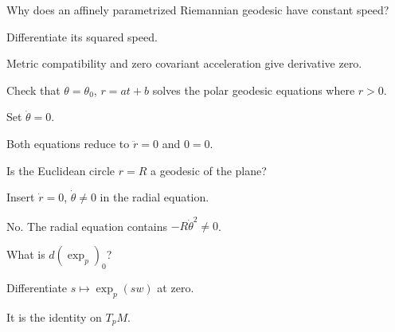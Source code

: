 \begin{exercise}\label{exr:vii23-ped-02}
Why does an affinely parametrized Riemannian geodesic have constant speed?
\end{exercise}

\begin{hint}
Differentiate its squared speed.
\end{hint}

\begin{solution}
Metric compatibility and zero covariant acceleration give derivative zero.
\end{solution}

\begin{exercise}\label{exr:vii23-ped-03}
Check that \(\theta=\theta_0\), \(r=at+b\) solves the polar geodesic equations where \(r>0\).
\end{exercise}

\begin{hint}
Set \(\dot\theta=0\).
\end{hint}

\begin{solution}
Both equations reduce to \(\ddot r=0\) and \(0=0\).
\end{solution}

\begin{exercise}\label{exr:vii23-ped-04}
Is the Euclidean circle \(r=R\) a geodesic of the plane?
\end{exercise}

\begin{hint}
Insert \(\dot r=0\), \(\dot\theta\ne0\) in the radial equation.
\end{hint}

\begin{solution}
No.  The radial equation contains \(-R\dot\theta^2\ne0\).
\end{solution}

\begin{exercise}\label{exr:vii23-ped-05}
What is \(d(\exp_p)_0\)?
\end{exercise}

\begin{hint}
Differentiate \(s\mapsto\exp_p(sw)\) at zero.
\end{hint}

\begin{solution}
It is the identity on \(T_pM\).
\end{solution}

